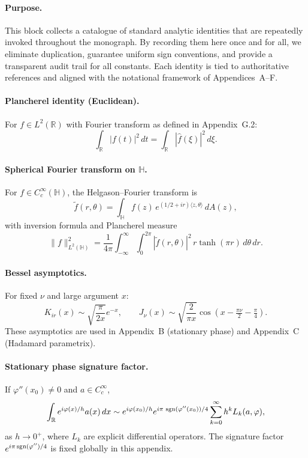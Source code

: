 \paragraph{Purpose.}  
This block collects a catalogue of standard analytic identities that are repeatedly invoked throughout the monograph.  
By recording them here once and for all, we eliminate duplication, guarantee uniform sign conventions, and provide a transparent audit trail for all constants.  
Each identity is tied to authoritative references and aligned with the notational framework of Appendices~A--F.

\medskip

\paragraph{Plancherel identity (Euclidean).}  
For $f \in L^2(\mathbb{R})$ with Fourier transform as defined in Appendix~G.2:
\[
\int_{\mathbb{R}} |f(t)|^2\, dt
  = \int_{\mathbb{R}} |\widehat{f}(\xi)|^2\, d\xi.
\]

\paragraph{Spherical Fourier transform on $\mathbb{H}$.}  
For $f \in C_c^\infty(\mathbb{H})$, the Helgason–Fourier transform is
\[
\widetilde{f}(r,\theta)
   = \int_{\mathbb{H}} f(z)\, e^{(1/2+ir)\langle z,\theta\rangle}\, dA(z),
\]
with inversion formula and Plancherel measure
\[
\|f\|_{L^2(\mathbb{H})}^2
   = \frac{1}{4\pi} \int_{-\infty}^\infty \int_{0}^{2\pi}
     |\widetilde{f}(r,\theta)|^2 \, r \tanh(\pi r)\, d\theta\, dr.
\]

\paragraph{Bessel asymptotics.}  
For fixed $\nu$ and large argument $x$:
\[
K_{i r}(x) \sim \sqrt{\frac{\pi}{2x}} e^{-x}, \qquad
J_\nu(x) \sim \sqrt{\frac{2}{\pi x}} \cos\!\left(x - \tfrac{\pi \nu}{2} - \tfrac{\pi}{4}\right).
\]
These asymptotics are used in Appendix~B (stationary phase) and Appendix~C (Hadamard parametrix).

\paragraph{Stationary phase signature factor.}  
If $\varphi''(x_0)\neq 0$ and $a\in C_c^\infty$,
\[
\int_{\mathbb{R}} e^{i\varphi(x)/h} a(x)\, dx
  \sim e^{i \varphi(x_0)/h}
       e^{i\pi \,\operatorname{sgn}(\varphi''(x_0))/4}
       \sum_{k=0}^\infty h^k L_k(a,\varphi),
\]
as $h\to 0^+$, where $L_k$ are explicit differential operators.  
The signature factor $e^{i\pi \operatorname{sgn}(\varphi'')/4}$ is fixed globally in this appendix.

